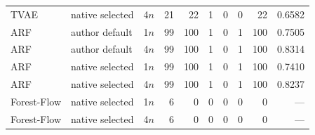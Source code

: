 \begin{longtable}{lllrrrrrrr}
TVAE & native selected & 4$n$ & 21 & 22 & 1 & 0 & 0 & 22 & 0.6582 \\
ARF & author default & 1$n$ & 99 & 100 & 1 & 0 & 1 & 100 & 0.7505 \\
ARF & author default & 4$n$ & 99 & 100 & 1 & 0 & 1 & 100 & 0.8314 \\
ARF & native selected & 1$n$ & 99 & 100 & 1 & 0 & 1 & 100 & 0.7410 \\
ARF & native selected & 4$n$ & 99 & 100 & 1 & 0 & 1 & 100 & 0.8237 \\
Forest-Flow & native selected & 1$n$ & 6 & 0 & 0 & 0 & 0 & 0 & --- \\
Forest-Flow & native selected & 4$n$ & 6 & 0 & 0 & 0 & 0 & 0 & --- \\
\bottomrule
\end{longtable}

